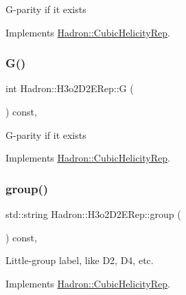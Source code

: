 G-\/parity if it exists 

Implements \mbox{\hyperlink{structHadron_1_1CubicHelicityRep_a50689f42be1e6170aa8cf6ad0597018b}{Hadron\+::\+Cubic\+Helicity\+Rep}}.

\mbox{\label{structHadron_1_1H3o2D2ERep_aaa942303f4efab9a27088a542e7ba809}} 
\subsubsection{\texorpdfstring{G()}{G()}\hspace{0.1cm}{\footnotesize\ttfamily [2/2]}}
{\footnotesize\ttfamily int Hadron\+::\+H3o2\+D2\+E\+Rep\+::G (\begin{DoxyParamCaption}{ }\end{DoxyParamCaption}) const\hspace{0.3cm}{\ttfamily [inline]}, {\ttfamily [virtual]}}

G-\/parity if it exists 

Implements \mbox{\hyperlink{structHadron_1_1CubicHelicityRep_a50689f42be1e6170aa8cf6ad0597018b}{Hadron\+::\+Cubic\+Helicity\+Rep}}.

\mbox{\label{structHadron_1_1H3o2D2ERep_ad9d9eb7585ef277acd3efb48c5912c95}} 
\subsubsection{\texorpdfstring{group()}{group()}\hspace{0.1cm}{\footnotesize\ttfamily [1/3]}}
{\footnotesize\ttfamily std\+::string Hadron\+::\+H3o2\+D2\+E\+Rep\+::group (\begin{DoxyParamCaption}{ }\end{DoxyParamCaption}) const\hspace{0.3cm}{\ttfamily [inline]}, {\ttfamily [virtual]}}

Little-\/group label, like D2, D4, etc. 

Implements \mbox{\hyperlink{structHadron_1_1CubicHelicityRep_a101a7d76cd8ccdad0f272db44b766113}{Hadron\+::\+Cubic\+Helicity\+Rep}}.

\mbox{\label{structHadron_1_1H3o2D2ERep_ad9d9eb7585ef277acd3efb48c5912c95}} 
